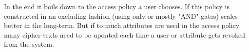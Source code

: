 In the end it boils down to the access policy a user chooses. If this policy is constructed in an excluding fashion (using only or mostly "AND"-gates)  \name scales better in the long-term. But if to much attributes are used in the access policy many cipher-texts need to be updated each time a user or attribute gets revoked from the system. 

